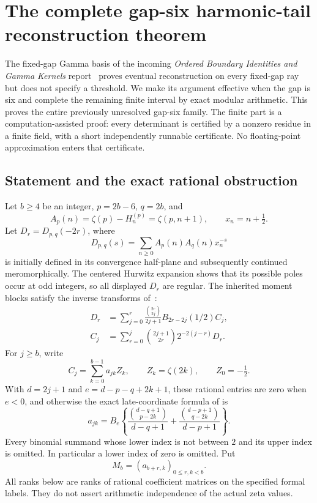 \section{The complete gap-six harmonic-tail reconstruction theorem}
\label{gs:section}

The fixed-gap Gamma basis of the incoming \emph{Ordered Boundary
Identities and Gamma Kernels} report~\cite{OrderedIncoming} proves eventual reconstruction
on every fixed-gap ray but does not specify a threshold.  We make its
argument effective when the gap is six and complete the remaining
finite interval by exact modular arithmetic.  This proves the entire
previously unresolved gap-six family.  The finite part is a
computation-assisted proof: every determinant is certified by a
nonzero residue in a finite field, with a short independently runnable
certificate.  No floating-point approximation enters that certificate.

\subsection{Statement and the exact rational obstruction}

Let $b\ge4$ be an integer, $p=2b-6$, $q=2b$, and
\[
 A_p(n)=\zeta(p)-H_n^{(p)}=\zeta(p,n+1),\qquad x_n=n+\tfrac12.
\]
Let $D_r=D_{p,q}(-2r)$, where
\[
 D_{p,q}(s)=\sum_{n\ge0}A_p(n)A_q(n)x_n^{-s}
\]
is initially defined in its convergence half-plane and subsequently
continued meromorphically.  The centered Hurwitz expansion shows that
its possible poles occur at odd integers, so all displayed $D_r$ are
regular.  The inherited moment blocks satisfy the inverse transforms
of~\cite[Section~8]{OrderedIncoming}:
\begin{align}
 D_r&=\sum_{j=0}^r\frac{\binom{2r}{2j}}{2j+1}
           B_{2r-2j}(1/2)C_j,\label{gs:forward}\\
 C_j&=\sum_{r=0}^j\binom{2j+1}{2r}2^{-2(j-r)}D_r.
 \label{gs:backward}
\end{align}
For $j\ge b$, write
\begin{equation}\label{gs:late}
 C_j=\sum_{k=0}^{b-1}a_{jk}Z_k,
 \qquad Z_k=\zeta(2k),\qquad Z_0=-\tfrac12.
\end{equation}
With $d=2j+1$ and $e=d-p-q+2k+1$, these rational entries are zero
when $e<0$, and otherwise the exact late-coordinate formula of
\cite[Section~8]{OrderedIncoming} is
\begin{equation}\label{gs:entry}
 a_{jk}=B_e\left\{
  \frac{\binom{d-q+1}{p-2k}}{d-q+1}
 +\frac{\binom{d-p+1}{q-2k}}{d-p+1}\right\}.
\end{equation}
Every binomial summand whose lower index is not between $2$ and its
upper index is omitted.  In particular a lower index of zero is
omitted.  Put
\[
 M_b=(a_{b+r,k})_{0\le r,k<b}.
\]
All ranks below are ranks of rational coefficient matrices on the
specified formal labels.  They do not assert arithmetic independence
of the actual zeta values.

